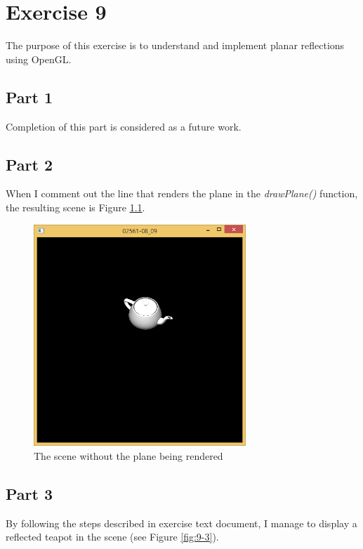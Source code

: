 \chapter{Exercise 9}
\label{cha:ugeopgave-9}

The purpose of this exercise is to understand and implement planar reflections using OpenGL.


\section{Part 1}

Completion of this part is considered as a future work.

\section{Part 2}

When I comment out the line that renders the plane in the \emph{drawPlane()} function, the resulting scene is Figure \ref{fig:9-2}.

\begin{figure}[hp]
\centering
\includegraphics[width=8cm]{../Screenshots/ex-9b/2.png}
\caption{The scene without the plane being rendered}
\label{fig:9-2}
\end{figure}

\section{Part 3}

By following the steps described in exercise text document, I manage to display a reflected teapot in the scene (see Figure \ref{fig:9-3}).

